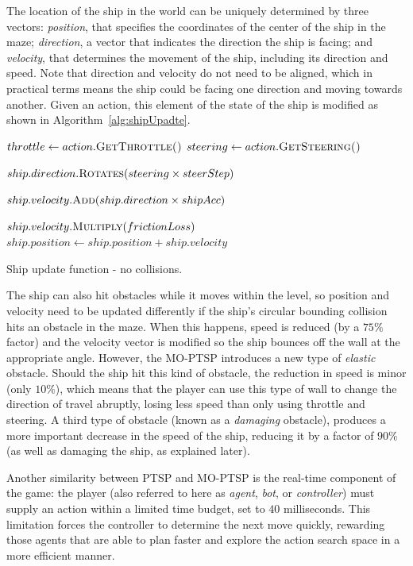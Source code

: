 \documentclass[conference]{IEEEtran}
\begin{document}
The location of the ship in the world can be uniquely determined by three vectors: \textit{position}, that specifies the coordinates of the center of the ship in the maze; \textit{direction}, a vector that indicates the direction the ship is facing; and \textit{velocity}, that determines the movement of the ship, including its direction and speed. Note that direction and velocity do not need to be aligned, which in practical terms means the ship could be facing one direction and moving towards another. Given an action, this element of the state of the ship is modified as shown in Algorithm~\ref{alg:shipUpadte}.

\begin{algorithm}[!h]
\begin{algorithmic}
	\State $throttle \gets action.\Call{GetThrottle()}{}$
	\State $steering \gets action.\Call{GetSteering()}{}$

	\State $ship.direction.\Call{Rotates}{steering \times steerStep}$

		\State $ship.velocity.\Call{Add}{ship.direction \times shipAcc}$
	\EndIf

	\State $ship.velocity.\Call{Multiply}{frictionLoss}$
	\State $ship.position \gets ship.position + ship.velocity$


\EndFunction
\end{algorithmic}
\caption{Ship update function - no collisions.}
\label{alg:shipUpadte}
\end{algorithm}

The ship can also hit obstacles while it moves within the level, so position and velocity need to be updated differently if the ship's circular bounding collision hits an obstacle in the maze. When this happens, speed is reduced (by a $75\%$ factor) and the velocity vector is modified so the ship bounces off the wall at the appropriate angle. However, the MO-PTSP introduces a new type of \textit{elastic} obstacle. Should the ship hit this kind of obstacle, the reduction in speed is minor (only $10\%$), which means that the player can use this type of wall to change the direction of travel abruptly, losing less speed than only using throttle and steering. A third type of obstacle (known as a \textit{damaging} obstacle), produces a more important decrease in the speed of the ship, reducing it by a factor of $90\%$ (as well as damaging the ship, as explained later).

Another similarity between PTSP and MO-PTSP is the real-time component of the game: the player (also referred to here as \textit{agent}, \textit{bot}, or \textit{controller}) must supply an action within a limited time budget, set to $40$ milliseconds. This limitation forces the controller to determine the next move quickly, rewarding those agents that are able to plan faster and explore the action search space in a more efficient manner.
\end{document}
